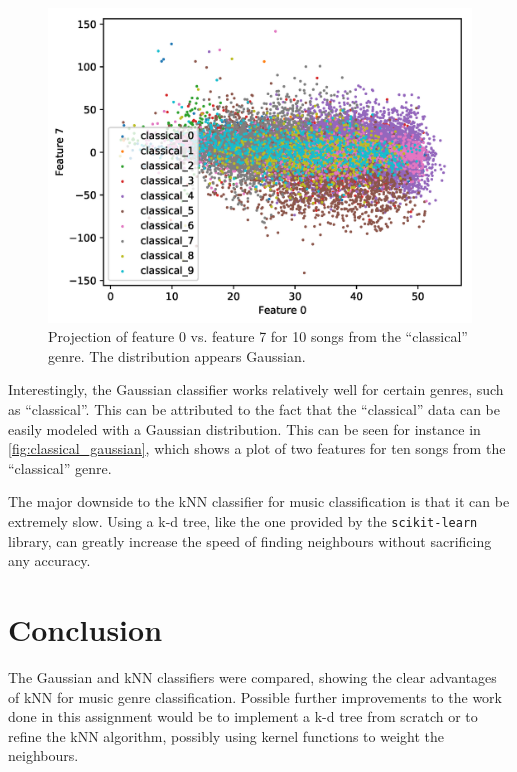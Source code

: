 \documentclass[a4paper,titlepage]{article}
\begin{document}
	\begin{figure}[!htb]
		\centering
		\includegraphics[width=\columnwidth]{plots/classical_gaussian.png}
		\caption
		{Projection of feature 0 vs. feature 7 for 10 songs from the ``classical'' genre. The distribution appears Gaussian.}
		\label{fig:classical_gaussian}
	\end{figure}

	Interestingly, the Gaussian classifier works relatively well for certain genres, such as ``classical''. This can be attributed to the fact that the ``classical'' data can be easily modeled with a Gaussian distribution. This can be seen for instance in \autoref{fig:classical_gaussian}, which shows a plot of two features for ten songs from the ``classical'' genre.
	
	
	The major downside to the kNN classifier for music classification is that it can be extremely slow. Using a k-d tree, like the one provided by the \texttt{scikit-learn} library, can greatly increase the speed of finding neighbours without sacrificing any accuracy.

	\section*{Conclusion}
	
	The Gaussian and kNN classifiers were compared, showing the clear advantages of kNN for music genre classification. Possible further improvements to the work done in this assignment would be to implement a k-d tree from scratch or to refine the kNN algorithm, possibly using kernel functions to weight the neighbours.
	
	
	
\end{document}
